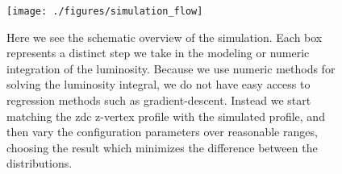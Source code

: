 \begin{figure}
\begin{center}
\texttt{[image: ./figures/simulation\_flow]}
\caption{
Here we see the schematic overview of the simulation. Each box represents a
distinct step we take in the modeling or numeric integration of the luminosity.
Because we use numeric methods for solving the luminosity integral, we do not
have easy access to regression methods such as gradient-descent. Instead we
start matching the zdc z-vertex profile with the simulated profile, and then
vary the configuration parameters over reasonable ranges, choosing the result
which minimizes the difference between the distributions.
}
\label{fig:simulation_flow}
\end{center}
\end{figure}
